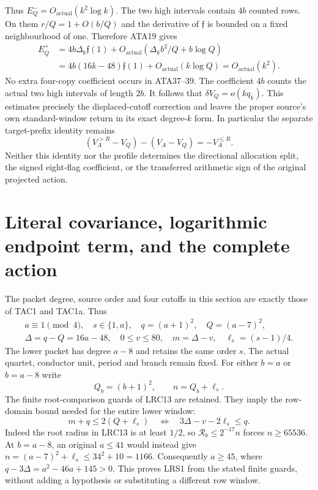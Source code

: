 \documentclass[11pt,a4paper]{article}
\begin{document}
Thus $E_Q^-=O_{\mathrm{actual}}(k^2\log k)$.
The two high intervals contain $4b$ counted rows.  On them
$r/Q=1+O(b/Q)$ and the derivative of $\mathfrak f$ is bounded
on a fixed neighbourhood of one.  Therefore ATA19 gives
\[
\begin{split}
 E_Q^+
 &=4b\Delta_k\mathfrak f(1)
       +O_{\mathrm{actual}}(\Delta_kb^2/Q+b\log Q)\\
 &=4b(16k-48)\mathfrak f(1)+O_{\mathrm{actual}}(k\log Q)
  =O_{\mathrm{actual}}(k^2).
\end{split}\tag{ATA39}
\]
No extra four-copy coefficient occurs in ATA37--39.  The coefficient
$4b$ counts the actual two high intervals of length $2b$.
It follows that $\delta V_Q=o(kq_k)$.  This estimates precisely the
displaced-cutoff correction and leaves the proper source's own
standard-window return in its exact degree-$k$ form.
In particular the separate target-prefix identity remains
\[
 (V_A^{>R}-V_Q)-(V_A-V_Q)=-V_A^{\le R}.                 \tag{ATA40}
\]
Neither this identity nor the profile determines the directional
allocation split, the signed eight-flag coefficient, or the transferred
arithmetic sign of the original projected action.
\endgroup


\section{Literal covariance, logarithmic endpoint term, and the complete action}
\label{sec:lrc-scalar-reconstruction}

The packet degree, source order and four cutoffs in this section are
exactly those of TAC1 and TAC1a.  Thus
\[
\begin{gathered}
 a\equiv1\pmod4,\quad s\in\{1,a\},\quad
 q=(a+1)^2,\quad Q=(a-7)^2,\\ \Delta=q-Q=16a-48,
 \quad 0\le v\le80,\quad m=\Delta-v,
 \quad \ell_s=(s-1)/4.
\end{gathered}
\]
The lower packet has degree $a-8$ and retains the same order $s$.
The actual quartet, conductor unit, period and branch remain fixed.
For either $b=a$ or $b=a-8$ write
\[
 Q_b=(b+1)^2,\qquad n=Q_b+\ell_s.
\]
The finite root-comparison guards of LRC13 are retained.  They imply
the row-domain bound needed for the entire lower window:
\begin{equation}\tag{LRS1}
 m+q\le2(Q+\ell_s)
 \quad\Longleftrightarrow\quad 3\Delta-v-2\ell_s\le q.
\end{equation}
Indeed the root radius in LRC13 is at least $1/2$, so
$\mathscr R_b\le2^{-17}n$ forces $n\ge65536$.
At $b=a-8$, an original $a\le41$ would instead give
$n=(a-7)^2+\ell_s\le34^2+10=1166$.
Consequently $a\ge45$, where $q-3\Delta=a^2-46a+145>0$.
This proves LRS1 from the stated finite guards, without adding a
hypothesis or substituting a different row window.
\end{document}
